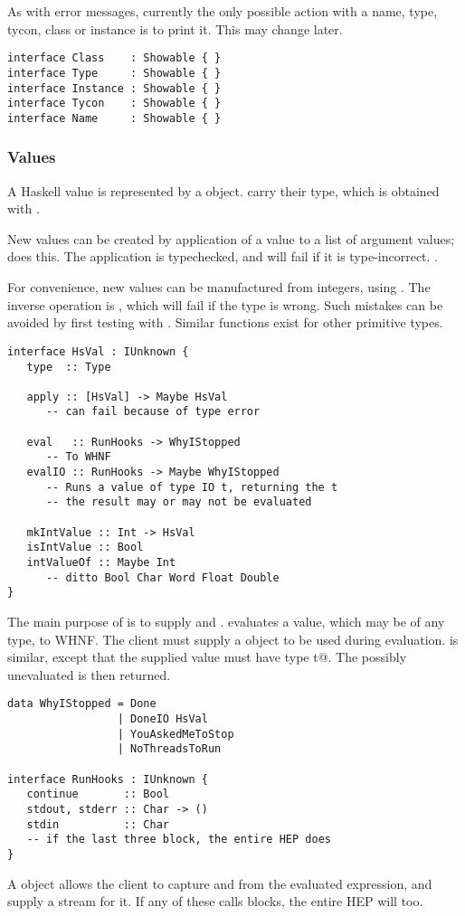 As with error messages, currently the only possible action with 
a name, type, tycon, class or instance is to print it.  This
may change later.
\begin{verbatim}
interface Class    : Showable { }
interface Type     : Showable { }
interface Instance : Showable { }
interface Tycon    : Showable { }
interface Name     : Showable { }
\end{verbatim}

\subsubsection{Values}
A Haskell value is represented by a \verb@HsVal@ object.
\verb@HsVal@s carry their type, which is obtained with
\verb@type@.  

New values can be created by application of
a value to a list of argument values; \verb@apply@ does this.
The application is typechecked, and will fail if it is type-incorrect.
.

For convenience, new values can be manufactured from integers,
using \verb@mkIntValue@.  The inverse operation is \verb@intValueOf@,
which will fail if the type is wrong.  Such mistakes can be avoided
by first testing with \verb@isIntValue@.    Similar functions
exist for other primitive types.
\begin{verbatim}
interface HsVal : IUnknown {
   type  :: Type

   apply :: [HsVal] -> Maybe HsVal
      -- can fail because of type error
      
   eval   :: RunHooks -> WhyIStopped   
      -- To WHNF
   evalIO :: RunHooks -> Maybe WhyIStopped
      -- Runs a value of type IO t, returning the t
      -- the result may or may not be evaluated

   mkIntValue :: Int -> HsVal
   isIntValue :: Bool
   intValueOf :: Maybe Int
      -- ditto Bool Char Word Float Double
}
\end{verbatim}
The main purpose of \verb@HsVal@ is to supply \verb@eval@ and
\verb@evalIO@.  \verb@eval@ evaluates a value, which may be of 
any type, to WHNF.  The client must supply a \verb@RunHooks@ object
to be used during evaluation.  \verb@evalIO@ is similar, except
that the supplied value must have type \verb@IO t@.   The 
possibly unevaluated \verb@t@ is then returned.
\begin{verbatim}
data WhyIStopped = Done
                 | DoneIO HsVal 
                 | YouAskedMeToStop 
                 | NoThreadsToRun

interface RunHooks : IUnknown {
   continue       :: Bool
   stdout, stderr :: Char -> ()
   stdin          :: Char
   -- if the last three block, the entire HEP does
}
\end{verbatim}
A \verb@RunHooks@ object allows the client to capture \verb@stdout@
and \verb@stderr@ from the evaluated expression, and supply a
\verb@stdin@ stream for it.  If any of these calls blocks, the
entire HEP will too.  

